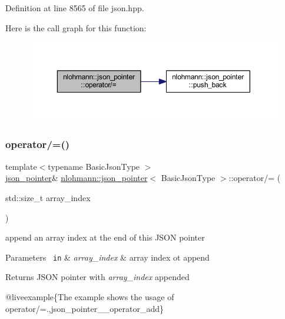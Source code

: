 Definition at line 8565 of file json.\+hpp.

Here is the call graph for this function\+:
\nopagebreak
\begin{figure}[H]
\begin{center}
\leavevmode
\includegraphics[width=350pt]{classnlohmann_1_1json__pointer_abdd21567b2b1d69329af0f520335e68b_cgraph}
\end{center}
\end{figure}
\mbox{\label{classnlohmann_1_1json__pointer_a64c8401529131bad1e486d91d703795f}} 
\subsubsection{\texorpdfstring{operator/=()}{operator/=()}\hspace{0.1cm}{\footnotesize\ttfamily [3/3]}}
{\footnotesize\ttfamily template$<$typename Basic\+Json\+Type $>$ \\
\mbox{\hyperlink{classnlohmann_1_1json__pointer}{json\+\_\+pointer}}\& \mbox{\hyperlink{classnlohmann_1_1json__pointer}{nlohmann\+::json\+\_\+pointer}}$<$ Basic\+Json\+Type $>$\+::operator/= (\begin{DoxyParamCaption}\item[{std\+::size\+\_\+t}]{array\+\_\+index }\end{DoxyParamCaption})\hspace{0.3cm}{\ttfamily [inline]}}



append an array index at the end of this J\+S\+ON pointer 


\begin{DoxyParams}[1]{Parameters}
\mbox{\texttt{ in}}  & {\em array\+\_\+index} & array index ot append \\
\hline
\end{DoxyParams}
\begin{DoxyReturn}{Returns}
J\+S\+ON pointer with {\itshape array\+\_\+index} appended
\end{DoxyReturn}
@liveexample\{The example shows the usage of {\ttfamily operator/=}.,json\+\_\+pointer\+\_\+\+\_\+operator\+\_\+add\}

